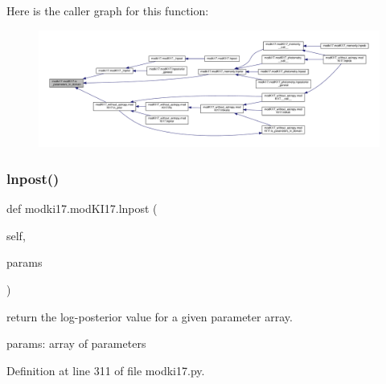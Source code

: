 Here is the caller graph for this function\+:\nopagebreak
\begin{figure}[H]
\begin{center}
\leavevmode
\includegraphics[width=350pt]{df/da3/classmodki17_1_1modKI17_a649064bb198ade8a8c6c59faeab6c9c4_icgraph}
\end{center}
\end{figure}
\mbox{\label{classmodki17_1_1modKI17_aa8e6d0ca906f1ab77cfc64f7ec15f327}} 
\subsubsection{\texorpdfstring{lnpost()}{lnpost()}}
{\footnotesize\ttfamily def modki17.\+mod\+K\+I17.\+lnpost (\begin{DoxyParamCaption}\item[{}]{self,  }\item[{}]{params }\end{DoxyParamCaption})}

\begin{DoxyVerb}return the log-posterior value for a given parameter array.

params: array of parameters
\end{DoxyVerb}
 

Definition at line 311 of file modki17.\+py.


